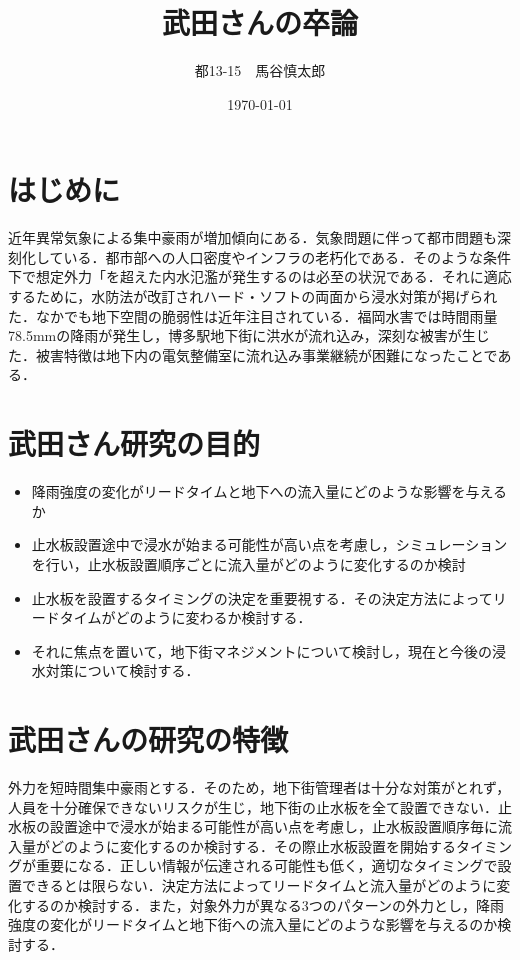 \documentclass[a4j]{jarticle}
\title{武田さんの卒論}
\author{都13-15　馬谷慎太郎}
\date{\today}
\begin{document}
\maketitle
\section{はじめに}
近年異常気象による集中豪雨が増加傾向にある．気象問題に伴って都市問題も深刻化している．都市部への人口密度やインフラの老朽化である．そのような条件下で想定外力「を超えた内水氾濫が発生するのは必至の状況である．それに適応するために，水防法が改訂されハード・ソフトの両面から浸水対策が掲げられた．なかでも地下空間の脆弱性は近年注目されている．福岡水害では時間雨量78.5mmの降雨が発生し，博多駅地下街に洪水が流れ込み，深刻な被害が生じた．被害特徴は地下内の電気整備室に流れ込み事業継続が困難になったことである．
\section{武田さん研究の目的}
\begin{itemize}
\item 降雨強度の変化がリードタイムと地下への流入量にどのような影響を与えるか
\item 止水板設置途中で浸水が始まる可能性が高い点を考慮し，シミュレーションを行い，止水板設置順序ごとに流入量がどのように変化するのか検討
\item 止水板を設置するタイミングの決定を重要視する．その決定方法によってリードタイムがどのように変わるか検討する．
 \item それに焦点を置いて，地下街マネジメントについて検討し，現在と今後の浸水対策について検討する．
  \end{itemize}
\section{武田さんの研究の特徴}
外力を短時間集中豪雨とする．そのため，地下街管理者は十分な対策がとれず，人員を十分確保できないリスクが生じ，地下街の止水板を全て設置できない．止水板の設置途中で浸水が始まる可能性が高い点を考慮し，止水板設置順序毎に流入量がどのように変化するのか検討する．その際止水板設置を開始するタイミングが重要になる．正しい情報が伝達される可能性も低く，適切なタイミングで設置できるとは限らない．決定方法によってリードタイムと流入量がどのように変化するのか検討する．また，対象外力が異なる3つのパターンの外力とし，降雨強度の変化がリードタイムと地下街への流入量にどのような影響を与えるのか検討する．
\end{document}

